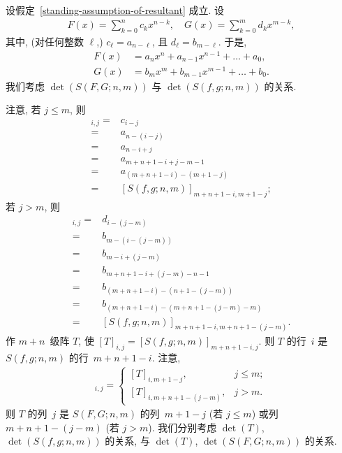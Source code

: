 \documentclass[../libro.tex]{subfiles}
\begin{document}
\begin{example}
    设假定~\ref{standing-assumption-of-resultant} 成立.
    设
    \begin{align*}
        F(x) = \sum_{k = 0}^{n} {c_k x^{n-k}},
        \quad
        G(x) = \sum_{k = 0}^{m} {d_k x^{m-k}},
    \end{align*}
    其中, (对任何整数 \(\ell\),)
    \(c_\ell = a_{n-\ell}\),
    且 \(d_\ell = b_{m-\ell}\).
    于是,
    \begin{align*}
        F(x) & = a_n x^n + a_{n-1} x^{n-1} + \dots + a_0, \\
        G(x) & = b_m x^m + b_{m-1} x^{m-1} + \dots + b_0.
    \end{align*}
    我们考虑
    \(\det {(S(F, G; n, m))}\)
    与
    \(\det {(S(f, g; n, m))}\)
    的关系.

    注意, 若 \(j \leq m\), 则
    \begin{align*}
        [S(F, G; n, m)]_{i,j}
        = {} & c_{i-j}                          \\
        = {} & a_{n-(i-j)}                      \\
        = {} & a_{n-i+j}                        \\
        = {} & a_{m+n+1-i+j-m-1}                \\
        = {} & a_{(m+n+1-i)-(m+1-j)}            \\
        = {} & [S(f, g; n, m)]_{m+n+1-i,m+1-j};
    \end{align*}
    若 \(j > m\), 则
    \begin{align*}
        [S(F, G; n, m)]_{i,j}
        = {} & d_{i-(j-m)}                            \\
        = {} & b_{m-(i-(j-m))}                        \\
        = {} & b_{m-i+(j-m)}                          \\
        = {} & b_{m+n+1-i+(j-m)-n-1}                  \\
        = {} & b_{(m+n+1-i)-(n+1-(j-m))}              \\
        = {} & b_{(m+n+1-i)-(m+n+1-(j-m)-m)}          \\
        = {} & [S(f, g; n, m)]_{m+n+1-i,m+n+1-(j-m)}.
    \end{align*}
    作 \(m+n\)~级阵 \(T\), 使
    \([T]_{i,j} = [S(f, g; n, m)]_{m+n+1-i,j}\).
    则 \(T\) 的行~\(i\) 是 \(S(f, g; n, m)\) 的行~\(m+n+1-i\).
    注意,
    \begin{align*}
        [S(F, G; n, m)]_{i,j} =
        \begin{cases}
            [T]_{i,m+1-j},       & j \leq m; \\
            [T]_{i,m+n+1-(j-m)}, & j > m.
        \end{cases}
    \end{align*}
    则 \(T\) 的列~\(j\) 是 \(S(F, G; n, m)\) 的列~\(m+1-j\)
    (若 \(j \leq m\))
    或列~\(m+n+1-(j-m)\)
    (若 \(j > m\)).
    我们分别考虑
    \(\det {(T)}\), \(\det {(S(f, g; n, m))}\) 的关系,
    与
    \(\det {(T)}\), \(\det {(S(F, G; n, m))}\)
    的关系.


\end{example}
\end{document}
